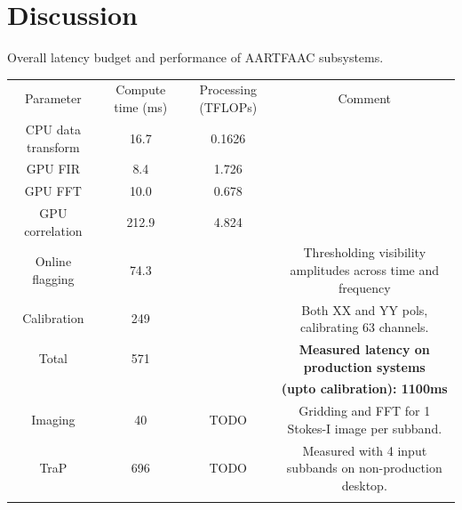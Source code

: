 \documentclass{ws-jai}
\begin{document}

\section {\label{sec:discussion} Discussion}
\begin{wstable}[h]
\caption{Overall latency budget and performance of AARTFAAC subsystems.}
\begin{tabular}{@{}cccc@{}} \toprule
Parameter & Compute time (ms) & Processing (TFLOPs) & Comment \\ \colrule
CPU data transform & 16.7 & 0.1626  \\
GPU FIR & 8.4 & 1.726\\
GPU FFT & 10.0 & 0.678  \\
GPU correlation & 212.9 & 4.824  \\
Online flagging & 74.3 &  & Thresholding visibility amplitudes across time and frequency\\
Calibration & 249 & & Both XX and YY pols, calibrating 63 channels.\\
 \colrule
Total & 571 & & \textbf{Measured latency on production systems} \\
 & & & \textbf {(upto calibration): 1100ms} \\ \colrule

Imaging & 40 & TODO & Gridding and FFT for 1 Stokes-I image per subband.\\ 
TraP & 696 & TODO & Measured with 4 input subbands on non-production desktop.\\ \colrule
\end{tabular}
\label{tab:afaac_latency}
\end{wstable}

\end{document}
